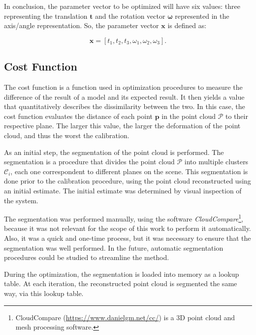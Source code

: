 \documentclass[conference]{IEEEtran}
\begin{document}
In conclusion, the parameter vector to be optimized will have six values: three representing the translation $\bm{t}$ and the rotation vector $\bm{\omega}$ represented in the axis/angle representation. So, the parameter vector $\bm{x}$ is defined as:

\begin{equation}
    \bm{x} = \left[t_1, t_2, t_3, \omega_1, \omega_2, \omega_3\right].
\end{equation}

\subsection{Cost Function}

The cost function is a function used in optimization procedures to measure the difference of the result of a model and its expected result. It then yields a value that quantitatively describes the dissimilarity between the two. In this case, the cost function evaluates the distance of each point $\mathbf{p}$ in the point cloud $\mathcal{P}$ to their respective plane. The larger this value, the larger the deformation of the point cloud, and thus the worst the calibration.

As an initial step, the segmentation of the point cloud is performed. The segmentation is a procedure that divides the point cloud $\mathcal{P}$ into multiple clusters $\mathcal{C}_i$, each one correspondent to different planes on the scene. This segmentation is done prior to the calibration procedure, using the point cloud reconstructed using an initial estimate. The initial estimate was determined by visual inspection of the system.

The segmentation was performed manually, using the software \textit{CloudCompare}\footnote{CloudCompare (\url{https://www.danielgm.net/cc/}) is a 3D point cloud and mesh processing software.}, because it was not relevant for the scope of this work to perform it automatically. Also, it was a quick and one-time process, but it was necessary to ensure that the segmentation was well performed. In the future, automatic segmentation procedures could be studied to streamline the method.

During the optimization, the segmentation is loaded into memory as a lookup table. At each iteration, the reconstructed point cloud is segmented the same way, via this lookup table.
\end{document}
